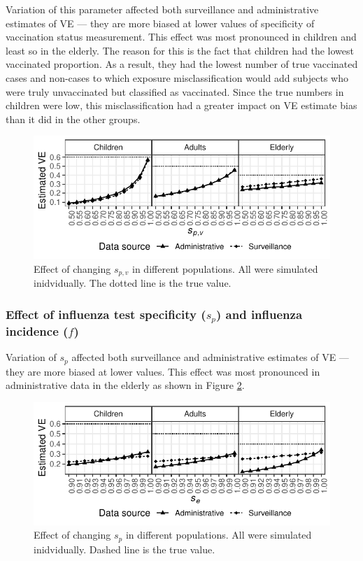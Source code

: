 \documentclass[11pt]{article}
\begin{document}
Variation of this parameter affected both surveillance and administrative estimates of VE --- they are more biased at lower values of specificity of vaccination status measurement. This effect was most pronounced in children and least so in the elderly. The reason for this is the fact that children had the lowest vaccinated proportion. As a result, they had the lowest number of true vaccinated cases and non-cases to which exposure misclassification would add subjects who were truly unvaccinated but classified as vaccinated. Since the true numbers in children were low, this misclassification had a greater impact on VE estimate bias than it did in the other groups.

\pagebreak

\begin{figure}[h]
	\centering
		\includegraphics[width=0.75\linewidth]{../fig-agesind/agesind-spec_vac.pdf}
		\caption{
Effect of changing $s_{p,v}$ in different populations. All were simulated inidvidually. The dotted line is the true value. \label{fig:agesind-spv}
		}
\end{figure}

\subsubsection{Effect of influenza test specificity ($s_p$) and influenza incidence ($f$)}

Variation of $s_p$ affected both surveillance and administrative estimates of VE --- they are more biased at lower values. This effect was most pronounced in administrative data in the elderly as shown in Figure \ref{fig:agesind-spf}.

\begin{figure}[h]
	\centering
		\includegraphics[width=0.75\linewidth]{../fig-agesind/agesind-spec_flu.pdf}
		\caption{
Effect of changing $s_p$ in different populations. All were simulated inidvidually. Dashed line is the true value. \label{fig:agesind-spf}
		}
\end{figure}
\end{document}
